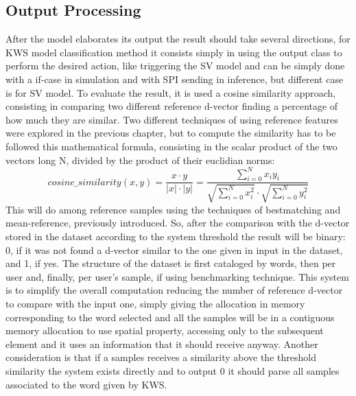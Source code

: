 \subsection{Output Processing}
After the model elaborates its output the result should take several directions, for KWS model classification method it consists simply in using the output class to perform the desired action, like triggering the SV model and can be simply done with a if-case in simulation and with SPI sending in inference, but different case is for SV model. To evaluate the result, it is used a cosine similarity approach, consisting in comparing two different reference d-vector finding a percentage of how much they are similar. Two different techniques of using reference features were explored in the previous chapter, but to compute the similarity has to be followed this mathematical formula, consisting in the scalar product of the two vectors long N, divided by the product of their euclidian norms:\newline
\begin{equation}
    cosine\_similarity(x,y)=\frac{x\cdot y}{|x|\cdot|y|}=\frac{\sum_{i=0}^{N}x_iy_i}{\sqrt{\sum_{i=0}^{N}x_i^2}\cdot\sqrt{\sum_{i=0}^{N}y_i^2}}
\end{equation}
This will do among reference samples using the techniques of bestmatching and mean-reference, previously introduced. So, after the comparison with the d-vector stored in the dataset according to the system threshold the result will be binary: 0, if it was not found a d-vector similar to the one given in input in the dataset, and 1, if yes.\newline
The structure of the dataset is first cataloged by words, then per user and, finally, per user's sample, if using benchmarking technique. This system is to simplify the overall computation reducing the number of reference d-vector to compare with the input one, simply giving the allocation in memory corresponding to the word selected and all the samples will be in a contiguous memory allocation to use spatial property, accessing only to the subsequent element and it uses an information that it should receive anyway. Another consideration is that if a samples receives a similarity above the threshold similarity the system exists directly and to output 0 it should parse all samples associated to the word given by KWS.\newline
